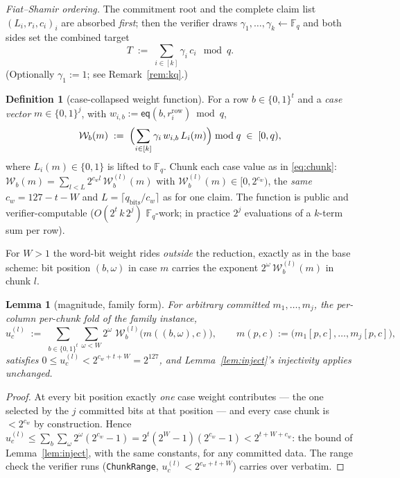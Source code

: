 \documentclass[11pt]{article}
\newcommand{\F}{\mathbb{F}}
\newcommand{\Fq}{\F_q}                 %
\newcommand{\bits}{\{0,1\}}
\newcommand{\eq}{\mathsf{eq}}
\newcommand{\cw}{c_w}
\newcommand{\Wc}{\mathcal{W}}          %
\DeclareRobustCommand{\code}[1]{{\def\_{\textunderscore\allowbreak}\texttt{#1}}}
\theoremstyle{plain}
\newtheorem{lemma}[theorem]{Lemma}
\theoremstyle{definition}
\newtheorem{definition}[theorem]{Definition}
\theoremstyle{remark}
\begin{document}
\emph{Fiat--Shamir ordering.} The commitment root and the complete claim list
$(L_i,r_i,c_i)_i$ are absorbed \emph{first}; then the verifier draws
$\gamma_1,\dots,\gamma_k\gets\Fq$ and both sides set the combined target
\[
  T \;:=\; \sum_{i\in[k]}\gamma_i\,c_i \ \bmod q .
\]
(Optionally $\gamma_1:=1$; see Remark~\ref{rem:kq}.)

\begin{definition}[case-collapsed weight function]\label{def:casew}
For a row $b\in\bits^{t}$ and a \emph{case vector} $m\in\bits^{j}$, with
$w_{i,b} := \eq(b, r_i^{\mathrm{row}})\bmod q$,
\[
  \Wc_b(m) \;:=\; \Bigl(\sum_{i\in[k]}\gamma_i\, w_{i,b}\, L_i(m)\Bigr)\bmod q
  \;\in\;[0,q),
\]
where $L_i(m)\in\bits$ is lifted to $\Fq$. Chunk each case value as in
\eqref{eq:chunk}: $\Wc_b(m)=\sum_{l<L}2^{\cw l}\,\Wc^{(l)}_b(m)$ with
$\Wc^{(l)}_b(m)\in[0,2^{\cw})$, the \emph{same} $\cw=127-t-W$ and
$L=\lceil q_{\mathrm{bits}}/\cw\rceil$ as for one claim. The function is
public and verifier-computable ($O(2^{t}\,k\,2^{j})$ $\Fq$-work; in practice
$2^{j}$ evaluations of a $k$-term sum per row).
\end{definition}

For $W>1$ the word-bit weight rides \emph{outside} the reduction, exactly as
in the base scheme: bit position $(b,\omega)$ in case $m$ carries the exponent
$2^{\omega}\,\Wc^{(l)}_b(m)$ in chunk $l$.

\begin{lemma}[magnitude, family form]\label{lem:familymag}
For arbitrary committed $m_1,\dots,m_j$, the per-column per-chunk fold of the
family instance,
\[
  u_c^{(l)} \;:=\; \sum_{b\in\bits^{t}}\sum_{\omega<W}
      2^{\omega}\;\Wc^{(l)}_b\bigl(m((b,\omega),c)\bigr),
  \qquad
  m(p,c) := \bigl(m_1[p,c],\dots,m_j[p,c]\bigr),
\]
satisfies $0\le u_c^{(l)} < 2^{\cw+t+W}=2^{127}$, and
Lemma~\ref{lem:inject}'s injectivity applies unchanged.
\end{lemma}

\begin{proof}
At every bit position exactly \emph{one} case weight contributes --- the one
selected by the $j$ committed bits at that position --- and every case chunk
is $<2^{\cw}$ by construction. Hence
$u^{(l)}_c \le \sum_b\sum_{\omega}2^{\omega}(2^{\cw}-1)
= 2^{t}(2^{W}-1)(2^{\cw}-1) < 2^{t+W+\cw}$: the bound of
Lemma~\ref{lem:inject}, with the same constants, for any committed data. The
range check the verifier runs (\code{ChunkRange}, $u^{(l)}_c<2^{\cw+t+W}$)
carries over verbatim.
\end{proof}
\end{document}
